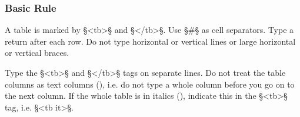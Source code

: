 \subsubsection{Basic Rule}
\label{section tables basic rule}

\begin{mainrule}
A table is marked by §<tb>§ and §</tb>§. Use §#§ as cell separators. Type a return after each row. Do not type horizontal or vertical lines or large horizontal or vertical braces.
\end{mainrule}

\begin{clarification}
Type the §<tb>§ and §</tb>§ tags on separate lines. Do not treat the table columns as text columns (), i.e. do not type a whole column before you go on to the next column. If the whole table is in italics (), indicate this in the §<tb>§ tag, i.e. §<tb it>§.
\end{clarification}

